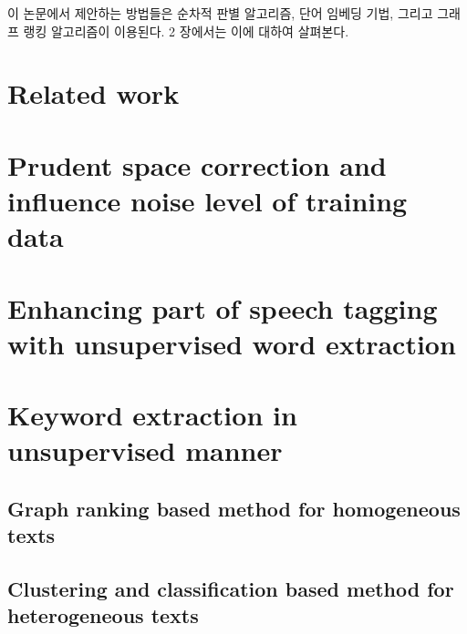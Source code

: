\documentclass[11pt]{article}
\begin{document}
이 논문에서 제안하는 방법들은 순차적 판별 알고리즘, 단어 임베딩 기법, 그리고 그래프 랭킹 알고리즘이 이용된다.
2 장에서는 이에 대하여 살펴본다.

\section{Related work}



\section{Prudent space correction and influence noise level of training data}




\section{Enhancing part of speech tagging with unsupervised word extraction}



\section{Keyword extraction in unsupervised manner}


\subsection{Graph ranking based method for homogeneous texts}



\subsection{Clustering and classification based method for heterogeneous texts}




\end{document}
